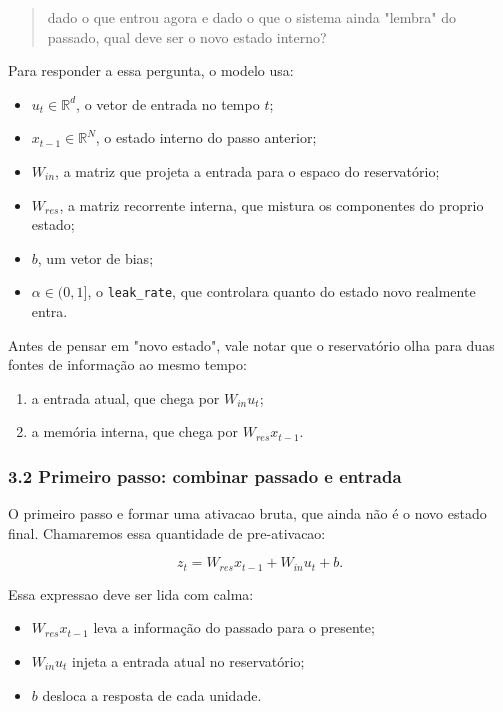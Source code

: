 \documentclass[12pt]{article}
\providecommand{\tightlist}{%
          \setlength{\itemsep}{0pt}\setlength{\parskip}{0pt}}
\begin{document}
\begin{quote}
dado o que entrou agora e dado o que o sistema ainda "lembra" do passado, qual deve ser o novo estado interno?
\end{quote}

Para responder a essa pergunta, o modelo usa:

\begin{itemize}
\tightlist
\item
  \(u_t \in \mathbb{R}^d\), o vetor de entrada no tempo \(t\);
\item
  \(x_{t-1} \in \mathbb{R}^N\), o estado interno do passo anterior;
\item
  \(W_{in}\), a matriz que projeta a entrada para o espaco do reservatório;
\item
  \(W_{res}\), a matriz recorrente interna, que mistura os componentes do proprio estado;
\item
  \(b\), um vetor de bias;
\item
  \(\alpha \in (0,1]\), o \texttt{leak\_rate}, que controlara quanto do estado novo realmente entra.
\end{itemize}

Antes de pensar em "novo estado", vale notar que o reservatório olha para duas fontes de informação ao mesmo tempo:

\begin{enumerate}
\def\labelenumi{\arabic{enumi}.}
\tightlist
\item
  a entrada atual, que chega por \(W_{in} u_t\);
\item
  a memória interna, que chega por \(W_{res} x_{t-1}\).
\end{enumerate}

\subsubsection{3.2 Primeiro passo: combinar passado e entrada}\label{32-primeiro-passo-combinar-passado-e-entrada}

O primeiro passo e formar uma ativacao bruta, que ainda não é o novo estado final. Chamaremos essa quantidade de pre-ativacao:

\[
z_t = W_{res} x_{t-1} + W_{in} u_t + b.
\]

Essa expressao deve ser lida com calma:

\begin{itemize}
\tightlist
\item
  \(W_{res} x_{t-1}\) leva a informação do passado para o presente;
\item
  \(W_{in} u_t\) injeta a entrada atual no reservatório;
\item
  \(b\) desloca a resposta de cada unidade.
\end{itemize}
\end{document}
